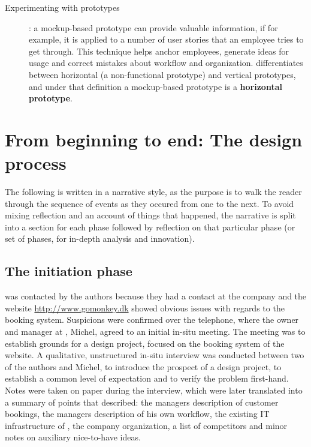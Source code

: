 \begin{description}
    \item [Experimenting with prototypes]: a mockup-based prototype can provide
        valuable information, if for example, it is applied to a number of user
        stories that an employee tries to get through. This technique helps
        anchor employees, generate ideas for usage and correct mistakes about
        workflow and organization. \cite{bodker2004participatory} differentiates
        between horizontal (a non-functional prototype) and vertical prototypes,
        and under that definition a mockup-based prototype is a
        \textbf{horizontal prototype}.
\end{description}

\section{From beginning to end: The design process} \label{sec:process}
The following is written in a narrative style, as the purpose is to
walk the reader through the sequence of events as they occured from one
to the next. To avoid mixing reflection and an account of things that happened,
the narrative is split into a section for each phase followed by reflection on
that particular phase (or set of phases, for in-depth analysis and innovation).

\subsection{The initiation phase}
\gomonkey{} was contacted by the authors because they had a contact at the
company and the website \url{http://www.gomonkey.dk} showed obvious issues with
regards to the booking system. Suspicions were confirmed over the telephone,
where the owner and manager at \gomonkey{}, Michel, agreed to an initial in-situ
meeting. The meeting was to establish grounds for a design project, focused on
the booking system of the \gomonkey{} website. A qualitative, unstructured
in-situ interview was conducted between two of the authors and Michel, to
introduce the prospect of a design project, to establish a common level of
expectation and to verify the problem first-hand. Notes were taken on paper
during the interview, which were later translated into a summary of points that
described: the managers description of customer bookings, the managers
description of his own workflow, the existing IT infrastructure of \gomonkey{},
the company organization, a list of competitors and minor notes on auxiliary
nice-to-have ideas.

